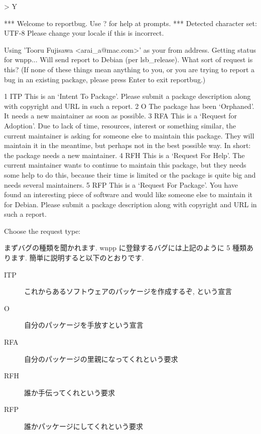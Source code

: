 \documentclass[mingoth,a4paper]{jsarticle}
\begin{document}
\begin{commandline}
\begin{commandline}
> Y

*** Welcome to reportbug.  Use ? for help at prompts. ***
Detected character set: UTF-8
Please change your locale if this is incorrect.

Using 'Tooru Fujisawa <arai_a@mac.com>' as your from address.
Getting status for wnpp...
Will send report to Debian (per lsb_release).
What sort of request is this? (If none of these things mean anything to you, or
you are trying to report a bug in an existing package, please press Enter to
exit reportbug.)

1 ITP  This is an `Intent To Package'. Please submit a package description
       along with copyright and URL in such a report.
2 O    The package has been `Orphaned'. It needs a new maintainer as soon as
       possible.
3 RFA  This is a `Request for Adoption'. Due to lack of time, resources,
       interest or something similar, the current maintainer is asking for
       someone else to maintain this package. They will maintain it in the
       meantime, but perhaps not in the best possible way. In short: the
       package needs a new maintainer.
4 RFH  This is a `Request For Help'. The current maintainer wants to continue
       to maintain this package, but they needs some help to do this, because
       their time is limited or the package is quite big and needs several
       maintainers.
5 RFP  This is a `Request For Package'. You have found an interesting piece of
       software and would like someone else to maintain it for Debian. Please
       submit a package description along with copyright and URL in such a
       report.

Choose the request type: 
\end{commandline}

まずバグの種類を聞かれます. wnpp に登録するバグには上記のように 5 種類あります.
簡単に説明すると以下のとおりです.

\begin{description}
 \item[ITP] これからあるソフトウェアのパッケージを作成するぞ, という宣言
 \item[O] 自分のパッケージを手放すという宣言
 \item[RFA] 自分のパッケージの里親になってくれという要求
 \item[RFH] 誰か手伝ってくれという要求
 \item[RFP] 誰かパッケージにしてくれという要求
\end{description}


\end{commandline}
\end{document}
